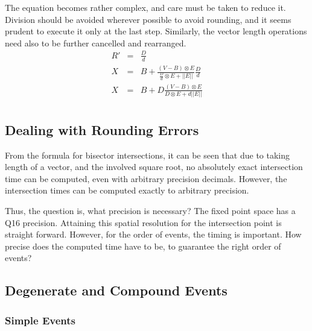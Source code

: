 \documentclass[12pt,a4paper,oneside,openany]{article}
\begin{document}
The equation becomes rather complex, and care must be taken to reduce it. Division should be avoided wherever possible to avoid rounding, and it seems prudent to execute it only at the last step. Similarly, the vector length operations need also to be further cancelled and rearranged.
\begin{eqnarray*}
R' &=& \frac{D}{d} \\
X &=& B + \frac{(V-B) \otimes E}{\frac{D}{d} \otimes E + ||E||} \frac{D}{d} \\
X &=& B + D \frac{(V-B) \otimes E}{D \otimes E + d ||E||} \\
\end{eqnarray*}


\subsection{Dealing with Rounding Errors}

From the formula for bisector intersections, it can be seen that due to taking length of a vector, and the involved square root, no absolutely exact intersection time can be computed, even with arbitrary precision decimals. However, the intersection times can be computed exactly to arbitrary precision.

Thus, the question is, what precision is necessary? The fixed point space has a Q16 precision. Attaining this spatial resolution for the intersection point is straight forward. However, for the order of events, the timing is important. How precise does the computed time have to be, to guarantee the right order of events?

\subsection{Degenerate and Compound Events}

\subsubsection{Simple Events}
\end{document}

